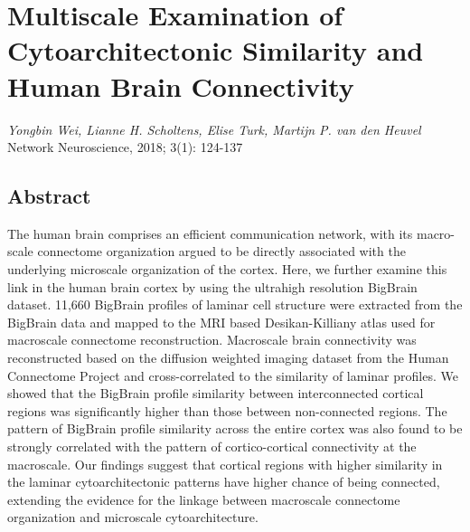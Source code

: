 \pagestyle{MyStyle}

\chapter[Cytoarchitectonic Similarity and Brain Connectivity]{Multiscale Examination of Cytoarchitectonic Similarity and Human Brain Connectivity}
\label{ch:fourthpaper}

\begin{refsection}


\begin{FlushRight}
\textit{Yongbin Wei, Lianne H. Scholtens, Elise Turk, Martijn P. van den Heuvel}\\
Network Neuroscience, 2018; 3(1): 124-137

\end{FlushRight}
\vspace{20pt}

\newpage
\section*{Abstract}
The human brain comprises an efficient communication network, with its macro-scale connectome organization argued to be directly associated with the underlying microscale organization of the cortex. Here, we further examine this link in the human brain cortex by using the ultrahigh resolution BigBrain dataset. 11,660 BigBrain profiles of laminar cell structure were extracted from the BigBrain data and mapped to the MRI based Desikan-Killiany atlas used for macroscale connectome reconstruction. Macroscale brain connectivity was reconstructed based on the diffusion weighted imaging dataset from the Human Connectome Project and cross-correlated to the similarity of laminar profiles. We showed that the BigBrain profile similarity between interconnected cortical regions was significantly higher than those between non-connected regions. The pattern of BigBrain profile similarity across the entire cortex was also found to be strongly correlated with the pattern of cortico-cortical connectivity at the macroscale. Our findings suggest that cortical regions with higher similarity in the laminar cytoarchitectonic patterns have higher chance of being connected, extending the evidence for the linkage between macroscale connectome organization and microscale cytoarchitecture.


\end{refsection}
